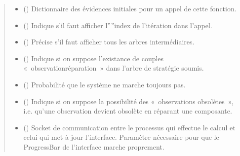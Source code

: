 \documentclass[letterpaper,10pt,french]{sphinxmanual}
\begin{document}
\begin{fulllineitems}
\begin{fulllineitems}
\begin{quote}
\begin{description}
\begin{itemize}
\item {} 
 (\sphinxstyleliteralemphasis{\sphinxupquote{, }}) \textendash{} Dictionnaire des évidences initiales pour un appel de cette
fonction.

\item {} 
 (\sphinxstyleliteralemphasis{\sphinxupquote{, }}) \textendash{} Indique s’il faut afficher l””index de l’itération dans l’appel.

\item {} 
 (\sphinxstyleliteralemphasis{\sphinxupquote{, }}) \textendash{} Précise s’il faut afficher tous les arbres intermédiaires.

\item {} 
 (\sphinxstyleliteralemphasis{\sphinxupquote{, }}) \textendash{} Indique si on suppose l’existance de couples
« observation\sphinxhyphen{}réparation » dans l’arbre de stratégie soumis.

\item {} 
 (\sphinxstyleliteralemphasis{\sphinxupquote{, }}) \textendash{} Probabilité que le système ne marche toujours pas.

\item {} 
 (\sphinxstyleliteralemphasis{\sphinxupquote{, }}) \textendash{} Indique si on suppose la possibilité des « observations obsolètes »,
i.e. qu’une observation devient obsolète en réparant une
composante.

\item {} 
 (\sphinxstyleliteralemphasis{\sphinxupquote{, }}) \textendash{} Socket de communication entre le processus qui effectue le calcul
et celui qui met à jour l’interface. Paramètre nécessaire pour que
le ProgressBar de l’interface marche proprement.


\end{itemize}
\end{description}
\end{quote}
\end{fulllineitems}
\end{fulllineitems}
\end{document}
